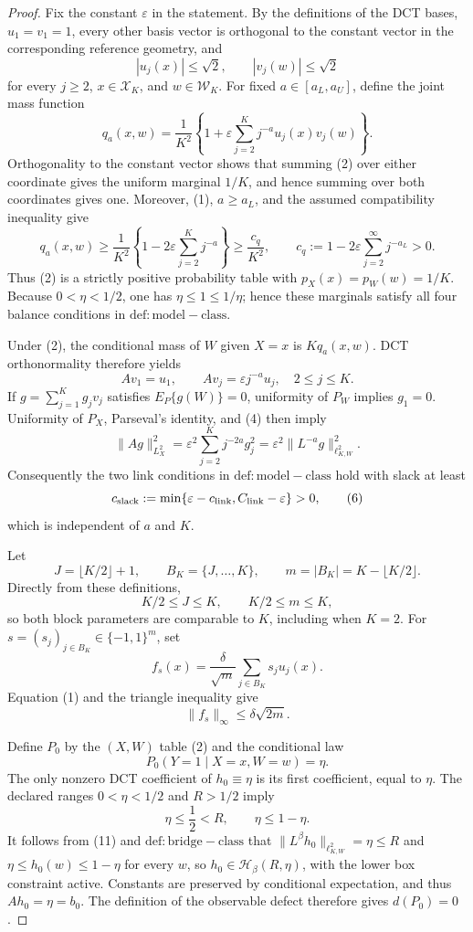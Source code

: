 \documentclass{article}
\begin{document}
\begin{proof}
Fix the constant \(\varepsilon\) in the statement.  By the definitions of the DCT bases, \(u_1=v_1=1\), every other basis vector is orthogonal to the constant vector in the corresponding reference geometry, and
\[
 |u_j(x)|\leq \sqrt{2},
 \qquad
 |v_j(w)|\leq \sqrt{2}
 \tag{1}
\]
for every \(j\geq 2\), \(x\in\mathcal X_K\), and \(w\in\mathcal W_K\).  For fixed \(a\in[a_L,a_U]\), define the joint mass function
\[
 q_a(x,w)=\frac{1}{K^2}\left\{1+\varepsilon
       \sum_{j=2}^K j^{-a}u_j(x)v_j(w)\right\}.
 \tag{2}
\]
Orthogonality to the constant vector shows that summing (2) over either coordinate gives the uniform marginal \(1/K\), and hence summing over both coordinates gives one.  Moreover, (1), \(a\geq a_L\), and the assumed compatibility inequality give
\[
 q_a(x,w)
 \geq \frac{1}{K^2}\left\{1-2\varepsilon\sum_{j=2}^Kj^{-a}\right\}
 \geq \frac{c_q}{K^2},
 \qquad
 c_q:=1-2\varepsilon\sum_{j=2}^{\infty}j^{-a_L}>0.
 \tag{3}
\]
Thus (2) is a strictly positive probability table with \(p_X(x)=p_W(w)=1/K\).  Because \(0<\eta<1/2\), one has \(\eta\leq1\leq1/\eta\); hence these marginals satisfy all four balance conditions in \(\mathrm{def:model-class}\).

Under (2), the conditional mass of \(W\) given \(X=x\) is \(Kq_a(x,w)\).  DCT orthonormality therefore yields
\[
 Av_1=u_1,
 \qquad
 Av_j=\varepsilon j^{-a}u_j,
 \quad 2\leq j\leq K.
 \tag{4}
\]
If \(g=\sum_{j=1}^K g_jv_j\) satisfies \(E_P\{g(W)\}=0\), uniformity of \(P_W\) implies \(g_1=0\).  Uniformity of \(P_X\), Parseval's identity, and (4) then imply
\[
 \|Ag\|_{L^2_X}^2
 =\varepsilon^2\sum_{j=2}^Kj^{-2a}g_j^2
 =\varepsilon^2\|L^{-a}g\|_{\ell^2_{K,W}}^2.
 \tag{5}
\]
Consequently the two link conditions in \(\mathrm{def:model-class}\) hold with slack at least
\[
 c_{\mathrm{slack}}
 :=\min\{\varepsilon-c_{\rm link},C_{\rm link}-\varepsilon\}>0,
 \tag{6}
\]
which is independent of \(a\) and \(K\).

Let
\[
 J=\lfloor K/2\rfloor+1,
 \qquad
 B_K=\{J,\ldots,K\},
 \qquad
 m=|B_K|=K-\lfloor K/2\rfloor.
\]
Directly from these definitions,
\[
 K/2\leq J\leq K,
 \qquad
 K/2\leq m\leq K,
 \tag{7}
\]
so both block parameters are comparable to \(K\), including when \(K=2\).  For \(s=(s_j)_{j\in B_K}\in\{-1,1\}^m\), set
\[
 f_s(x)=\frac{\delta}{\sqrt m}\sum_{j\in B_K}s_ju_j(x).
 \tag{8}
\]
Equation (1) and the triangle inequality give
\[
 \|f_s\|_\infty\leq\delta\sqrt{2m}.
 \tag{9}
\]

Define \(P_0\) by the \((X,W)\) table (2) and the conditional law
\[
 P_0(Y=1\mid X=x,W=w)=\eta.
 \tag{10}
\]
The only nonzero DCT coefficient of \(h_0\equiv\eta\) is its first coefficient, equal to \(\eta\).  The declared ranges \(0<\eta<1/2\) and \(R>1/2\) imply
\[
 \eta\leq\frac12<R,
 \qquad
 \eta\leq1-\eta.
 \tag{11}
\]
It follows from (11) and \(\mathrm{def:bridge-class}\) that
\(\|L^\beta h_0\|_{\ell^2_{K,W}}=\eta\leq R\) and
\(\eta\leq h_0(w)\leq1-\eta\) for every \(w\), so
\(h_0\in\mathcal H_\beta(R,\eta)\), with the lower box constraint active.  Constants are preserved by conditional expectation, and thus \(Ah_0=\eta=b_0\).  The definition of the observable defect therefore gives \(d(P_0)=0\).


\end{proof}
\end{document}
